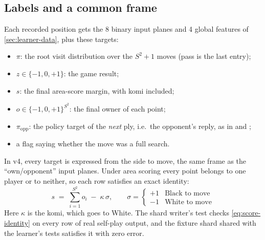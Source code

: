 \subsection{Labels and a common frame}
\label{sec:selfplay-labels}

Each recorded position gets the 8 binary input planes and 4 global features of
\cref{sec:learner-data}, plus these targets:
\begin{itemize}
  \item $\pi$: the root visit distribution over the $S^2+1$ moves (pass is the last entry);
  \item $z \in \{-1,0,+1\}$: the game result;
  \item $s$: the final area-score margin, with komi included;
  \item $o \in \{-1,0,+1\}^{S^2}$: the final owner of each point;
  \item $\pi_{\mathrm{opp}}$: the policy target of the \emph{next} ply, i.e.\ the
        opponent's reply, as in \citet{tian2016better} and \citet[\S3.4]{wu2019accelerating};
  \item a flag saying whether the move was a full search.
\end{itemize}
In v4, every target is expressed from the side to move, the same frame as the
``own/opponent'' input planes. Under area scoring every point belongs to one player or to
neither, so each row satisfies an exact identity:
\begin{equation}
  s \;=\; \sum_{i=1}^{S^2} o_i \;-\; \kappa\,\sigma, \qquad
  \sigma = \begin{cases} +1 & \text{Black to move}\\ -1 & \text{White to move}\end{cases}
  \label{eq:score-identity}
\end{equation}
Here $\kappa$ is the komi, which goes to White. The shard writer's test checks
\cref{eq:score-identity} on every row of real self-play output, and the fixture shard
shared with the learner's tests satisfies it with zero error.

